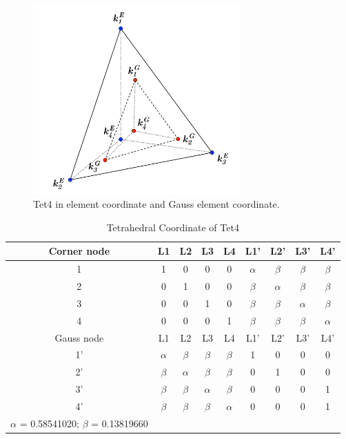 \begin{figure}[h]
	\begin{center}
		\includegraphics[width=8cm,clip]{Tet4_1.pdf}			
		\caption{Tet4 in element coordinate and Gauss element coordinate.} \label{fig: Tet4_1}
	\end{center} 
\end{figure}

\begin{table}
	\centering
	\caption{Tetrahedral Coordinate of Tet4} \label{tab: Tet4}
	\begin{tabular}{ccccccccc}			
		\hline
		Corner node\centering& L1& L2& L3& L4& L1'& L2'& L3'& L4'\\ \hline
		1\centering& 1& 0& 0& 0& $\alpha$& $\beta$& $\beta$& $\beta$\\
		2\centering& 0& 1& 0& 0& $\beta$& $\alpha$& $\beta$& $\beta$\\
		3\centering& 0& 0& 1& 0& $\beta$& $\beta$& $\alpha$& $\beta$\\
		4\centering& 0& 0& 0& 1& $\beta$& $\beta$& $\beta$& $\alpha$\\
		\hline
		Gauss node\centering& L1& L2& L3& L4& L1'& L2'& L3'& L4' \\ \hline
		1'\centering& $\alpha$& $\beta$& $\beta$& $\beta$& 1& 0& 0& 0  \\
		2'\centering&$\beta$ & $\alpha$& $\beta$& $\beta$& 0& 1& 0& 0 \\
		3'\centering& $\beta$& $\beta$& $\alpha$& $\beta$& 0& 0& 0& 1\\
		4'\centering& $\beta$& $\beta$& $\beta$& $\alpha$& 0& 0& 0& 1\\
		\hline
		$\alpha$ = 0.58541020; $\beta$ = 0.13819660&&&&&&&&\\
		\hline 		    
	\end{tabular}	
\end{table}		

